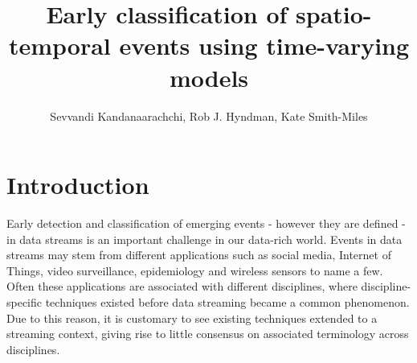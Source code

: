 \documentclass[11pt]{article}
\begin{document}
	\title{Early classification of spatio-temporal events using time-varying models}
	\author{Sevvandi Kandanaarachchi, Rob J. Hyndman, Kate Smith-Miles}
	\maketitle
	

	



	\section{Introduction}
	
	Early detection and classification of emerging events - however they are defined - in data streams is an important challenge in our data-rich world. Events in data streams may stem from different applications such as social media, Internet of Things, video surveillance, epidemiology and wireless sensors to name a few. Often these applications are associated with different disciplines, where discipline-specific techniques existed before data streaming became a common phenomenon. Due to this reason, it is customary to see existing techniques extended to a streaming context, giving rise to little consensus on associated terminology across disciplines.  
	
\end{document}
